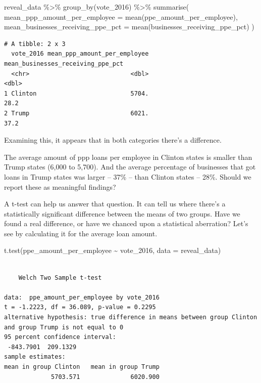 \documentclass[
  letterpaper,
  DIV=11,
  numbers=noendperiod]{scrreprt}
\newenvironment{Shaded}{\begin{snugshade}}{\end{snugshade}}
\newcommand{\AttributeTok}[1]{\textcolor[rgb]{0.40,0.45,0.13}{#1}}
\newcommand{\FunctionTok}[1]{\textcolor[rgb]{0.28,0.35,0.67}{#1}}
\newcommand{\NormalTok}[1]{\textcolor[rgb]{0.00,0.23,0.31}{#1}}
\newcommand{\SpecialCharTok}[1]{\textcolor[rgb]{0.37,0.37,0.37}{#1}}
\begin{document}
\begin{Shaded}
\begin{Highlighting}[]
\NormalTok{reveal\_data }\SpecialCharTok{\%\textgreater{}\%}
  \FunctionTok{group\_by}\NormalTok{(vote\_2016) }\SpecialCharTok{\%\textgreater{}\%}
  \FunctionTok{summarise}\NormalTok{(}
    \AttributeTok{mean\_ppp\_amount\_per\_employee =} \FunctionTok{mean}\NormalTok{(ppe\_amount\_per\_employee),}
    \AttributeTok{mean\_businesses\_receiving\_ppe\_pct =} \FunctionTok{mean}\NormalTok{(businesses\_receiving\_ppe\_pct)}
\NormalTok{  )}
\end{Highlighting}
\end{Shaded}

\begin{verbatim}
# A tibble: 2 x 3
  vote_2016 mean_ppp_amount_per_employee mean_businesses_receiving_ppe_pct
  <chr>                            <dbl>                             <dbl>
1 Clinton                          5704.                              28.2
2 Trump                            6021.                              37.2
\end{verbatim}

Examining this, it appears that in both categories there's a difference.

The average amount of ppp loans per employee in Clinton states is
smaller than Trump states (6,000 to 5,700). And the average percentage
of businesses that got loans in Trump states was larger -- 37\% -- than
Clinton states -- 28\%. Should we report these as meaningful findings?

A t-test can help us answer that question. It can tell us where there's
a statistically significant difference between the means of two groups.
Have we found a real difference, or have we chanced upon a statistical
aberration? Let's see by calculating it for the average loan amount.

\begin{Shaded}
\begin{Highlighting}[]
\FunctionTok{t.test}\NormalTok{(ppe\_amount\_per\_employee }\SpecialCharTok{\textasciitilde{}}\NormalTok{ vote\_2016, }\AttributeTok{data =}\NormalTok{ reveal\_data)}
\end{Highlighting}
\end{Shaded}

\begin{verbatim}

    Welch Two Sample t-test

data:  ppe_amount_per_employee by vote_2016
t = -1.2223, df = 36.089, p-value = 0.2295
alternative hypothesis: true difference in means between group Clinton and group Trump is not equal to 0
95 percent confidence interval:
 -843.7901  209.1329
sample estimates:
mean in group Clinton   mean in group Trump 
             5703.571              6020.900 
\end{verbatim}
\end{document}
